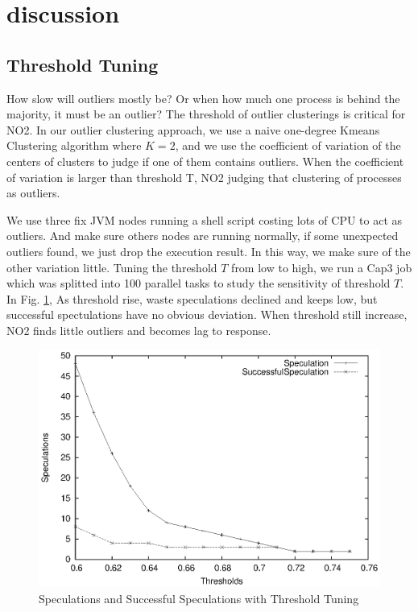 \section{discussion}

\subsection{Threshold Tuning}

How slow will outliers mostly be? Or when how much one process is behind the majority, it must be an outlier? The threshold of outlier clusterings is critical for NO2. In our outlier clustering approach, we use a naive one-degree Kmeans Clustering algorithm where $K = 2$, and we use the coefficient of variation of the centers of clusters to judge if one of them contains outliers. When the coefficient of variation is larger than threshold T, NO2 judging that clustering of processes as outliers.

We use three fix JVM nodes running a shell script costing lots of CPU to act as outliers. And make sure others nodes are running normally, if some unexpected outliers found, we just drop the execution result. In this way, we make sure of the other variation little. Tuning the threshold $T$ from low to high, we run a Cap3 job which was splitted into 100 parallel tasks to study the sensitivity of threshold $T$. In Fig. \ref{figure:thresholdtuning}, As threshold rise, waste speculations declined and keeps low, but successful spectulations have no obvious deviation. When threshold still increase, NO2 finds little outliers and becomes lag to response. 

\begin{figure}
\centering
\includegraphics[width=0.9\columnwidth]{figures/threshold&speculation.eps}
\caption{Speculations and Successful Speculations with Threshold Tuning}
\label{figure:thresholdtuning}
\end{figure}

